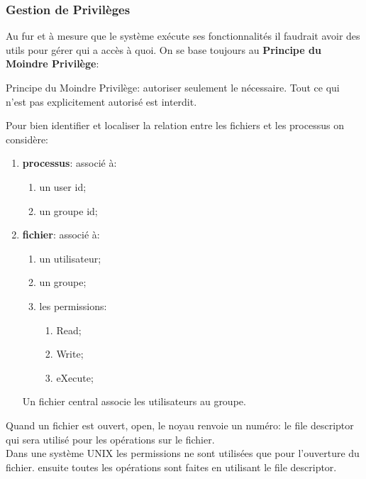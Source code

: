 \documentclass{article}
\begin{document}
\subsubsection{Gestion de Privilèges}
Au fur et à mesure que le système exécute ses fonctionnalités il faudrait avoir des utils pour gérer qui a accès à quoi. On se base toujours au \textbf{Principe du Moindre Privilège}:
\begin{definition}
    Principe du Moindre Privilège: autoriser seulement le nécessaire. Tout ce qui n'est pas explicitement autorisé est interdit.
\end{definition}
Pour bien identifier et localiser la relation entre les fichiers et les processus on considère:
\begin{enumerate}
    \item \textbf{processus}: associé à:
    \begin{enumerate}[noitemsep]
        \item un user id;
        \item un groupe id;
    \end{enumerate}
    
    \item \textbf{fichier}: associé à:
    \begin{enumerate}[noitemsep]
        \item un utilisateur;
        \item un groupe;
        \item les permissions:
        \begin{enumerate}[noitemsep]
            \item Read;
            \item Write;
            \item eXecute;
        \end{enumerate}
    \end{enumerate}
    Un fichier central associe les utilisateurs au groupe.
\end{enumerate}
Quand un fichier est ouvert, open, le noyau renvoie un numéro: le file descriptor qui sera utilisé pour les opérations sur le fichier.\\

Dans une système UNIX les permissions ne sont utilisées que pour l'ouverture du fichier. ensuite toutes les opérations sont faites en utilisant le file descriptor.\\
\end{document}

